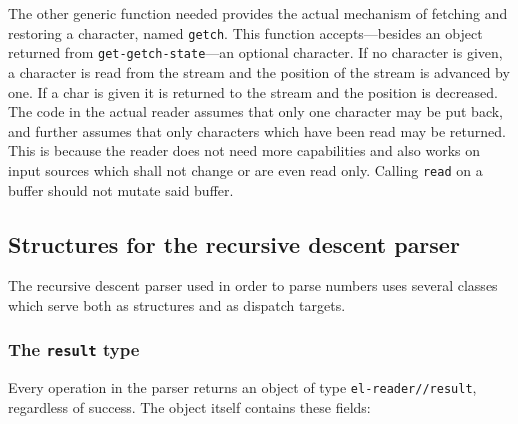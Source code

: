 \documentclass[a4paper,10pt,twoside]{report}
\newcommand{\sym}[1]{\texttt{#1}}
\newcommand{\fun}[1]{\texttt{#1}}
\newcommand{\Read}{\fun{read}}
\begin{document}
The other generic function needed provides the actual mechanism of fetching and
restoring a character, named \fun{getch}.  This function accepts---besides an
object returned from \fun{get-getch-state}---an optional character.  If no
character is given, a character is read from the stream and the position of the
stream is advanced by one.  If a char is given it is returned to the stream and
the position is decreased.  The code in the actual reader assumes that only one
character may be put back, and further assumes that only characters which have
been read may be returned.  This is because the reader does not need more
capabilities and also works on input sources which shall not change or are even
read only.  Calling \Read{} on a buffer should not mutate said buffer.

\subsection{Structures for the recursive descent parser}
\label{subsec:parser-structs}

The recursive descent parser used in order to parse numbers uses several classes
which serve both as structures and as dispatch targets.

\subsubsection{The \sym{result} type}
\label{subsubsec:result}

Every operation in the parser returns an object of type \fun{el-reader//result},
regardless of success.  The object itself contains these fields:
\end{document}
